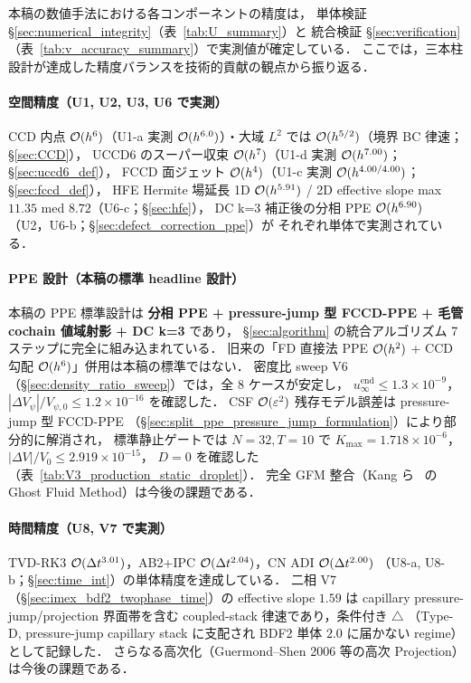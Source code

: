 本稿の数値手法における各コンポーネントの精度は，
単体検証 §\ref{sec:numerical_integrity}（表~\ref{tab:U_summary}）と
統合検証 §\ref{sec:verification}（表~\ref{tab:v_accuracy_summary}）で実測値が確定している．
ここでは，三本柱設計が達成した精度バランスを技術的貢献の観点から振り返る．

\paragraph{空間精度（U1, U2, U3, U6 で実測）}
CCD 内点 $\mathcal{O}(h^6)$（U1-a 実測 $\mathcal{O}(h^{6.0})$）・大域 $L^2$ では $\mathcal{O}(h^{5/2})$（境界 BC 律速；§\ref{sec:CCD}），
UCCD6 のスーパー収束 $\mathcal{O}(h^7)$（U1-d 実測 $\mathcal{O}(h^{7.00})$；§\ref{sec:uccd6_def}），
FCCD 面ジェット $\mathcal{O}(h^4)$（U1-c 実測 $\mathcal{O}(h^{4.00/4.00})$；§\ref{sec:fccd_def}），
HFE Hermite 場延長 1D $\mathcal{O}(h^{5.91})$ / 2D effective slope max $11.35$ med $8.72$（U6-c；§\ref{sec:hfe}），
	DC k=3 補正後の分相 PPE $\mathcal{O}(h^{6.90})$（U2，U6-b；§\ref{sec:defect_correction_ppe}）が
それぞれ単体で実測されている．

\paragraph{PPE 設計（本稿の標準 headline 設計）}
本稿の PPE 標準設計は \textbf{分相 PPE + pressure-jump 型 FCCD-PPE + 毛管 cochain 値域射影 + DC k=3} であり，
§\ref{sec:algorithm} の統合アルゴリズム 7 ステップに完全に組み込まれている．
旧来の「FD 直接法 PPE $\mathcal{O}(h^2)$ + CCD 勾配 $\mathcal{O}(h^6)$」併用は本稿の標準ではない．
密度比 sweep V6（§\ref{sec:density_ratio_sweep}）では，全 8 ケースが安定し，
$u_\infty^{\mathrm{end}}\le1.3\times10^{-9}$，
$|\Delta V_\psi|/V_{\psi,0}\le1.2\times10^{-16}$ を確認した．
CSF $\mathcal{O}(\varepsilon^2)$ 残存モデル誤差は pressure-jump 型 FCCD-PPE
（§\ref{sec:split_ppe_pressure_jump_formulation}）により部分的に解消され，
標準静止ゲートでは $N=32,T=10$ で
$K_{\max}=1.718\times10^{-6}$，$|\Delta V|/V_0\le2.919\times10^{-15}$，
$D=0$ を確認した（表~\ref{tab:V3_production_static_droplet}）．
完全 GFM 整合（Kang ら~\cite{Kang2000} の Ghost Fluid Method）は今後の課題である．

\paragraph{時間精度（U8, V7 で実測）}
TVD-RK3 $\mathcal{O}(\Delta t^{3.01})$，AB2+IPC $\mathcal{O}(\Delta t^{2.04})$，CN ADI $\mathcal{O}(\Delta t^{2.00})$
（U8-a, U8-b；§\ref{sec:time_int}）の単体精度を達成している．
二相 V7（§\ref{sec:imex_bdf2_twophase_time}）の effective slope $1.59$ は
capillary pressure-jump/projection 界面帯を含む coupled-stack 律速であり，条件付き $\triangle$
（Type-D, pressure-jump capillary stack に支配され BDF2 単体 $2.0$ に届かない regime）
として記録した．
さらなる高次化（Guermond--Shen 2006 等の高次 Projection）は今後の課題である．

